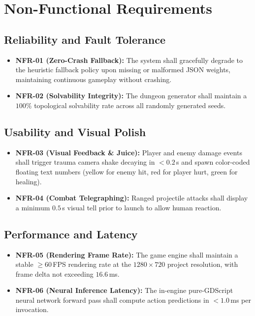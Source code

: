 \section{Non-Functional Requirements}

\subsection{Reliability and Fault Tolerance}
\begin{itemize}
    \item \textbf{NFR-01 (Zero-Crash Fallback):} The system shall gracefully degrade to the heuristic fallback policy upon missing or malformed JSON weights, maintaining continuous gameplay without crashing.
    \item \textbf{NFR-02 (Solvability Integrity):} The dungeon generator shall maintain a $100\%$ topological solvability rate across all randomly generated seeds.
\end{itemize}

\subsection{Usability and Visual Polish}
\begin{itemize}
    \item \textbf{NFR-03 (Visual Feedback \& Juice):} Player and enemy damage events shall trigger trauma camera shake decaying in $<0.2$\,s and spawn color-coded floating text numbers (yellow for enemy hit, red for player hurt, green for healing).
    \item \textbf{NFR-04 (Combat Telegraphing):} Ranged projectile attacks shall display a minimum $0.5$\,s visual tell prior to launch to allow human reaction.
\end{itemize}

\subsection{Performance and Latency}
\begin{itemize}
    \item \textbf{NFR-05 (Rendering Frame Rate):} The game engine shall maintain a stable $\ge 60$\,FPS rendering rate at the $1280\times720$ project resolution, with frame delta not exceeding $16.6$\,ms.
    \item \textbf{NFR-06 (Neural Inference Latency):} The in-engine pure-GDScript neural network forward pass shall compute action predictions in $<1.0$\,ms per invocation.
\end{itemize}

